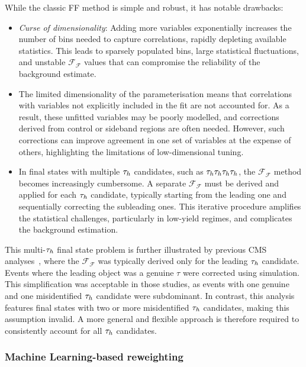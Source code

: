 While the classic FF method is simple and robust, it has notable drawbacks:
\begin{itemize}
\item \textit{Curse of dimensionality}: Adding more variables exponentially increases the number of bins needed to capture correlations, rapidly depleting available statistics. This leads to sparsely populated bins, large statistical fluctuations, and unstable $\mathcal{F_F}$ values that can compromise the reliability of the background estimate.

\item The limited dimensionality of the parameterisation means that correlations with variables not explicitly included in the fit are not accounted for. As a result, these unfitted variables may be poorly modelled, and corrections derived from control or sideband regions are often needed. However, such corrections can improve agreement in one set of variables at the expense of others, highlighting the limitations of low-dimensional tuning.

\item In final states with multiple $\tau_h$ candidates, such as $ \tau_h \tau_h \tau_h \tau_h $, the $\mathcal{F_F}$ method becomes increasingly cumbersome. A separate $\mathcal{F_F}$ must be derived and applied for each $\tau_h$ candidate, typically starting from the leading one and sequentially correcting the subleading ones. This iterative procedure amplifies the statistical challenges, particularly in low-yield regimes, and complicates the background estimation.
\end{itemize}

This multi-$\tau_h$ final state problem is further illustrated by previous CMS analyses~\cite{CMS:2022goy,Mb:2022rxu}, where the $\mathcal{F_F}$ was typically derived only for the leading $\tau_h$ candidate. Events where the leading object was a genuine $\tau$ were corrected using simulation. This simplification was acceptable in those studies, as events with one genuine and one misidentified $\tau_h$ candidate were subdominant. In contrast, this analysis features final states with two or more misidentified $\tau_h$ candidates, making this assumption invalid. A more general and flexible approach is therefore required to consistently account for all $\tau_h$ candidates.

\subsubsection{Machine Learning-based reweighting}
\label{Section:Chapter6_FakeFactors_BDT}

